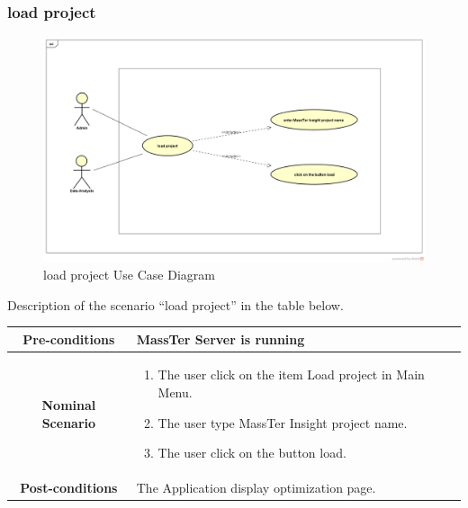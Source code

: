 \documentclass[12pt]{article}
\begin{document}
	 \subsubsection{load project}
	 	\begin{figure}[h]
	\centering
	\includegraphics[width=1.0\textwidth]{loadProject.png}
	\caption{load project Use Case Diagram}
	
	\end{figure}

 Description of the scenario ``load project'' in the table below.
 
  \begin{table}
 	\centering
 	\begin{tabular}{|c|p{10cm}|}
 		\hline 	
 		\textbf{Pre-conditions } & MassTer Server is running \\ 
 		\hline                     
 		\textbf{Nominal Scenario } & \begin{enumerate}
 			\item The user click on the item Load project in Main Menu.
 			\item The user type MassTer Insight project name.
 			\item The user click on the button load. 
 		\end{enumerate} \\ 
 		\hline 
 		\textbf{Post-conditions} & The Application display optimization page. \\
 		\hline 
 	\end{tabular}
 \end{table}
 
\clearpage
\newpage
\end{document}
